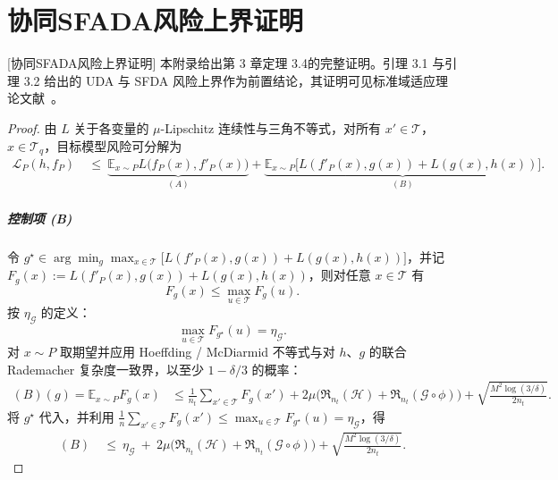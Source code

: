 \appendix
\chapter{协同SFADA风险上界证明}[协同SFADA风险上界证明]%
本附录给出第 3 章定理 3.4的完整证明。引理 3.1 与引理 3.2 给出的 UDA 与 SFDA 风险上界作为前置结论，其证明可见标准域适应理论文献~\cite{mathelin2022discrepancy}。
\label{app:theorem_3_4_proof}

\begin{proof}
由 $L$ 关于各变量的 $\mu$-Lipschitz 连续性与三角不等式，对所有 $x'\in \mathcal T$，$x\in \mathcal T_q$，目标模型风险可分解为
\begin{align}
\mathcal L_P(h,f_P) \ &\le\ \underbrace{\mathbb E_{x\sim P}L\big(f_P(x),f'_P(x)\big)}_{(A)}  + \underbrace{\mathbb E_{x\sim P}\!\big[L(f'_P(x),g(x))+L(g(x),h(x))\big]}_{(B)}.
\end{align}

\paragraph{控制项 (B)}
令 $g^\star\in\arg\min_g\max_{x\in\mathcal T}\big[L(f'_P(x),g(x))+L(g(x),h(x))\big]$，并记 $F_g(x):=L(f'_P(x),g(x))+L(g(x),h(x))$，则对任意 $x\in \mathcal T$ 有
\begin{equation}
F_g(x)\le \max_{u\in\mathcal T} F_g(u).
\end{equation}
按 $\eta_{\mathcal G}$ 的定义：
\begin{equation*}
\max_{u\in\mathcal T}F_{g^\star}(u)=\eta_{\mathcal G}.
\end{equation*}
对 $x\sim P$ 取期望并应用 Hoeffding / McDiarmid 不等式与对 $h$、$g$ 的联合 Rademacher 复杂度一致界，以至少 $1-\delta/3$ 的概率：
\begin{align}
(B)(g)=\mathbb E_{x\sim P}F_g(x) &\le \frac{1}{n_t}\sum_{x'\in \mathcal T}F_g(x') + 2\mu \big(\mathfrak R_{n_t}(\mathcal H)+ \mathfrak R_{n_t}(\mathcal G \circ\phi)\big)+\sqrt{\tfrac{M^2\log(3/\delta)}{2n_t}}.
\end{align}
将 $g^\star$ 代入，并利用 $\frac{1}{n}\sum_{x'\in \mathcal T}F_g(x')\le \max_{u\in\mathcal T}F_{g^\star}(u)=\eta_{\mathcal G}$，得
\begin{align}
(B) \ &\le\ \eta_{\mathcal G} \ +\ 2\mu\big(\mathfrak R_{n_t}(\mathcal H)+\mathfrak R_{n_t}(\mathcal G\circ\phi)\big) +\sqrt{\tfrac{M^2\log(3/\delta)}{2n_t}}.
\end{align}


\end{proof}

